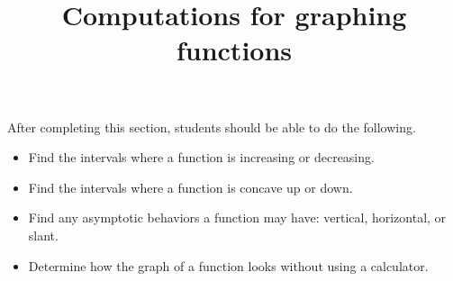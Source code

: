\documentclass{ximera}
\title{Computations for graphing functions}
\begin{document}
\begin{abstract}
\end{abstract}

\maketitle

\begin{sectionOutcomes}

After completing this section, students should be able to do the following.

\begin{itemize}
\item Find the intervals where a function is increasing or decreasing.
\item Find the intervals where a function is concave up or down.
\item Find any asymptotic behaviors a function may have: vertical,
  horizontal, or slant.
\item Determine how the graph of a function looks without using a calculator.
\end{itemize}

\end{sectionOutcomes}
\end{document}
